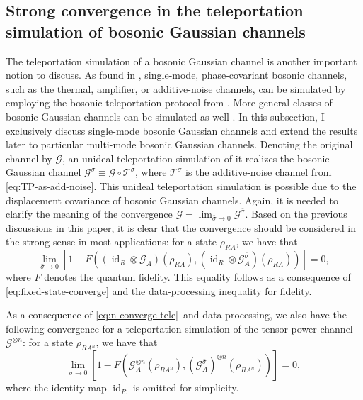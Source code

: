 \documentclass[apsrev,twocolumn]{revtex4-1}%
\begin{document}
\subsection{Strong convergence in the teleportation simulation of bosonic
Gaussian channels}

\label{sec:tele-sim}

The teleportation simulation of a bosonic Gaussian channel is another
important notion to discuss. As found in \cite{NFC09}, single-mode,
phase-covariant bosonic channels, such as the thermal, amplifier, or
additive-noise channels, can be simulated by employing the bosonic
teleportation protocol from \cite{prl1998braunstein}. More general classes of
bosonic Gaussian channels can be simulated as well \cite{WPG07}. In this subsection, I
exclusively discuss single-mode bosonic Gaussian channels and extend the results later to particular multi-mode bosonic Gaussian channels. Denoting the
original channel by $\mathcal{G}$, an unideal teleportation simulation of it
realizes the bosonic Gaussian channel $\mathcal{G}^{\bar{\sigma}}%
\equiv\mathcal{G}\circ\mathcal{T}^{\bar{\sigma}}$, where $\mathcal{T}%
^{\bar{\sigma}}$ is the additive-noise channel from
\eqref{eq:TP-as-add-noise}. This unideal teleportation simulation is possible
due to the displacement covariance of bosonic Gaussian channels. Again, it is
needed to clarify the meaning of the convergence $\mathcal{G}=\lim
_{\bar{\sigma}\rightarrow0}\mathcal{G}^{\bar{\sigma}}$. Based on the previous
discussions in this paper, it is clear that the convergence should be
considered in the strong sense in most applications: for a state $\rho_{RA}$,
we have that%
\begin{equation}
\lim_{\bar{\sigma}\rightarrow0}\left[  1-F((\operatorname{id}_{R}%
\otimes\mathcal{G}_{A})(\rho_{RA}),(\operatorname{id}_{R}\otimes
\mathcal{G}_{A}^{\bar{\sigma}})(\rho_{RA}))\right]  =0,
\end{equation}
where $F$ denotes the quantum fidelity. This equality follows as a consequence
of \eqref{eq:fixed-state-converge} and the data-processing inequality for fidelity.

As a consequence of \eqref{eq:n-converge-tele}\ and data processing, we also
have the following convergence for a teleportation simulation of the
tensor-power channel $\mathcal{G}^{\otimes n}$: for a state $\rho_{RA^{n}}$,
we have that%
\begin{equation}
\lim_{\bar{\sigma}\rightarrow0}\left[  1-F(\mathcal{G}_{A}^{\otimes n}%
(\rho_{RA^{n}}),(\mathcal{G}_{A}^{\bar{\sigma}})^{\otimes n}(\rho_{RA^{n}%
}))\right]  =0,
\end{equation}
where the identity map $\operatorname{id}_{R}$ is omitted for simplicity.
\end{document}
